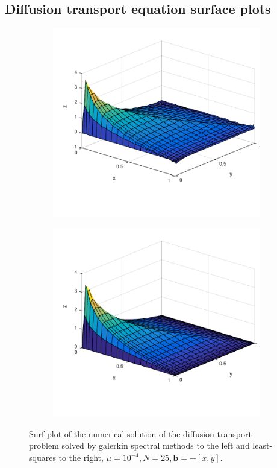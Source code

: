\subsection{Diffusion transport equation surface plots}
\begin{figure}[h!]
  \centering
  \begin{subfigure}[b]{0.48\textwidth}
	\includegraphics[width=\textwidth]{Figures/Spec_difftrans_aNeg.pdf}
  \end{subfigure}%
  \quad
  \begin{subfigure}[b]{0.48\textwidth}
	\includegraphics[width=\textwidth]{Figures/SpecLS_difftrans_aNeg.pdf}
  \end{subfigure}
  \vspace{-0.1\baselineskip}
	\caption{Surf plot of the numerical solution of the diffusion transport problem solved by galerkin spectral methods to the left and least-squares to the right, $\mu = 10^{-4},N=25,\mathbf{b} = -[x,y]$.}
  \label{fig:SurfDiffTransPositive}
\end{figure}
